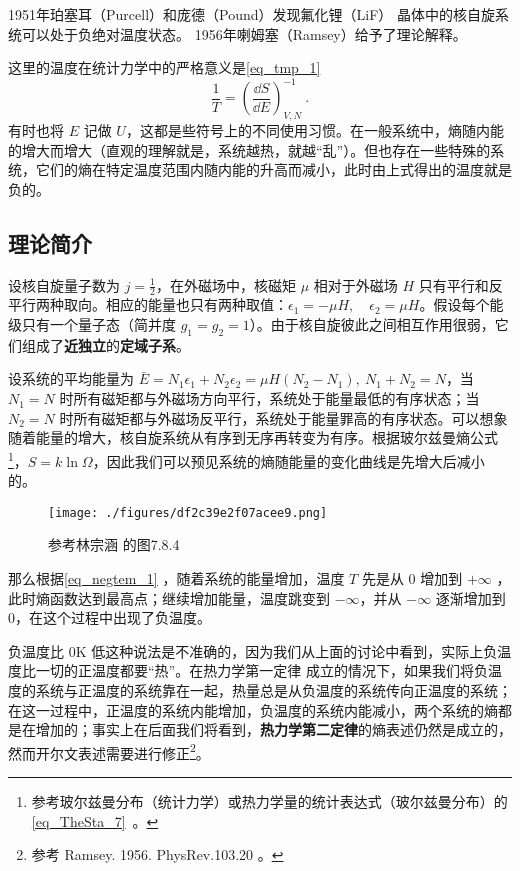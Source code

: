 

1951年珀塞耳（Purcell）和庞德（Pound）发现氟化锂（LiF） 晶体中的核自旋系统可以处于负绝对温度状态。
1956年喇姆塞（Ramsey）给予了理论解释。\cite{热统}

这里的温度在统计力学中的严格意义是\autoref{eq_tmp_1}~
\begin{equation}\label{eq_negtem_1}
\frac{1}{T}=\left(\frac{\dd S}{\dd E}\right)_{V,N}^{-1}~.
\end{equation}
有时也将 $E$ 记做 $U$，这都是些符号上的不同使用习惯。在一般系统中，熵随内能的增大而增大（直观的理解就是，系统越热，就越“乱”）。但也存在一些特殊的系统，它们的熵在特定温度范围内随内能的升高而减小，此时由上式得出的温度就是负的。

\subsection{理论简介}
设核自旋量子数为 $j=\frac{1}{2}$，在外磁场中，核磁矩 $\mu$ 相对于外磁场 $H$ 只有平行和反平行两种取向。相应的能量也只有两种取值：$\epsilon_1=-\mu H,\quad \epsilon_2=\mu H$。假设每个能级只有一个量子态（简并度 $g_1=g_2=1$）。由于核自旋彼此之间相互作用很弱，它们组成了\textbf{近独立}的\textbf{定域子系}。

设系统的平均能量为 $\bar{E}=N_1\epsilon_1+N_2\epsilon_2=\mu H(N_2-N_1),\ N_1+N_2=N$，当 $N_1=N$ 时所有磁矩都与外磁场方向平行，系统处于能量最低的有序状态；当 $N_2=N$ 时所有磁矩都与外磁场反平行，系统处于能量罪高的有序状态。可以想象随着能量的增大，核自旋系统从有序到无序再转变为有序。根据玻尔兹曼熵公式\footnote{参考玻尔兹曼分布（统计力学）或热力学量的统计表达式（玻尔兹曼分布）的\autoref{eq_TheSta_7}~。}，$S=k\ln \Omega$，因此我们可以预见系统的熵随能量的变化曲线是先增大后减小的。
\begin{figure}[ht]
\centering
\texttt{[image: ./figures/df2c39e2f07acee9.png]}
\caption{参考林宗涵\cite{林宗涵} 的图7.8.4} \label{fig_negtem_1}
\end{figure}
那么根据\autoref{eq_negtem_1} ，随着系统的能量增加，温度 $T$ 先是从 $0$ 增加到 $+\infty$ ，此时熵函数达到最高点；继续增加能量，温度跳变到 $-\infty$，并从 $-\infty$ 逐渐增加到 $0$，在这个过程中出现了负温度。

负温度比 $0 \mathrm{K}$ 低这种说法是不准确的，因为我们从上面的讨论中看到，实际上负温度比一切的正温度都要“热”。在热力学第一定律 成立的情况下，如果我们将负温度的系统与正温度的系统靠在一起，热量总是从负温度的系统传向正温度的系统；在这一过程中，正温度的系统内能增加，负温度的系统内能减小，两个系统的熵都是在增加的；事实上在后面我们将看到，\textbf{热力学第二定律}的熵表述仍然是成立的，然而开尔文表述需要进行修正\footnote{参考 Ramsey. 1956. PhysRev.103.20 。}。
